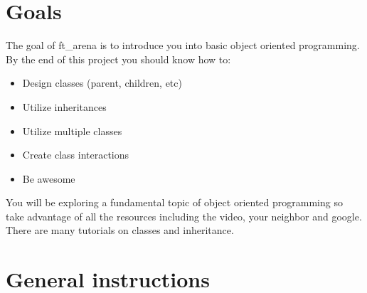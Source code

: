 \documentclass{42-en}
\begin{document}
\chapter{Goals}

	The goal of ft\_arena is to introduce you into basic object oriented programming.
	By the end of this project you should know how to:\\
	
	\begin{itemize}
		\item Design classes (parent, children, etc)
		\item Utilize inheritances
		\item Utilize multiple classes
		\item Create class interactions
		\item Be awesome\\
	\end{itemize}
	 
	You will be exploring a fundamental topic of object oriented programming
	so take advantage of all the resources including the video, your neighbor
	and google. There are many tutorials on classes and inheritance.


\chapter{General instructions}
\end{document}
